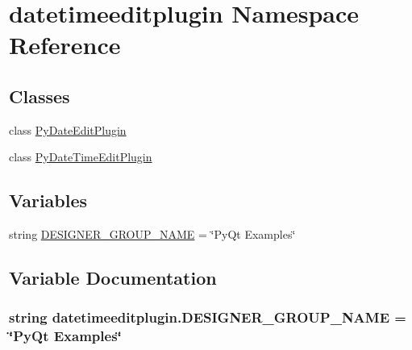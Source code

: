 \hypertarget{namespacedatetimeeditplugin}{}\section{datetimeeditplugin Namespace Reference}
\label{namespacedatetimeeditplugin}
\subsection*{Classes}
\begin{DoxyCompactItemize}
\item 
class \hyperlink{classdatetimeeditplugin_1_1PyDateEditPlugin}{Py\+Date\+Edit\+Plugin}
\item 
class \hyperlink{classdatetimeeditplugin_1_1PyDateTimeEditPlugin}{Py\+Date\+Time\+Edit\+Plugin}
\end{DoxyCompactItemize}
\subsection*{Variables}
\begin{DoxyCompactItemize}
\item 
string \hyperlink{namespacedatetimeeditplugin_ab1fcaafcb9b3ae285488aa4825710875}{D\+E\+S\+I\+G\+N\+E\+R\+\_\+\+G\+R\+O\+U\+P\+\_\+\+N\+A\+M\+E} = \char`\"{}Py\+Qt Examples\char`\"{}
\end{DoxyCompactItemize}


\subsection{Variable Documentation}
\hypertarget{namespacedatetimeeditplugin_ab1fcaafcb9b3ae285488aa4825710875}{}
\subsubsection[{D\+E\+S\+I\+G\+N\+E\+R\+\_\+\+G\+R\+O\+U\+P\+\_\+\+N\+A\+M\+E}]{\setlength{\rightskip}{0pt plus 5cm}string datetimeeditplugin.\+D\+E\+S\+I\+G\+N\+E\+R\+\_\+\+G\+R\+O\+U\+P\+\_\+\+N\+A\+M\+E = \char`\"{}Py\+Qt Examples\char`\"{}}\label{namespacedatetimeeditplugin_ab1fcaafcb9b3ae285488aa4825710875}
